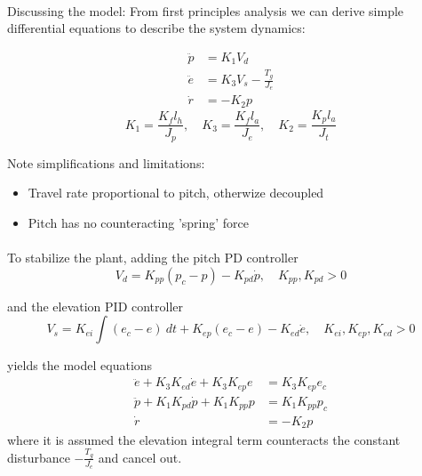 \paragraph{}
Discussing the model: From first principles analysis we can derive simple differential equations to describe the system dynamics:

\begin{subequations}
	\label{eq:dynamics}
	\begin{align}
		\ddot{p} &= K_1 V_d\\
		\ddot{e} &= K_3 V_s - \frac{T_g}{J_e}\\
		\dot{r} &= -K_2 p
	\end{align}
\end{subequations}
\begin{equation*}
K_1 = \frac{K_f l_h}{J_p}, \quad K_3 = \frac{K_f l_a}{J_e}, \quad K_2 = \frac{K_p l_a}{J_t}
\end{equation*}

Note simplifications and limitations:
\begin{itemize}
	\item{Travel rate proportional to pitch, otherwize decoupled}
	\item{Pitch has no counteracting 'spring' force}
\end{itemize}

\paragraph{}

To stabilize the plant, adding the pitch PD controller
\begin{equation*}
	V_d = K_{pp} (p_c - p) - K_{pd} \dot{p}, \quad K_{pp}, K_{pd} > 0
\end{equation*}

and the elevation PID controller
\begin{equation*}
	V_s = K_{ei} \int (e_c - e) \ dt +  K_{ep} (e_c - e) - K_{ed} \dot{e}, \quad K_{ei}, K_{ep}, K_{ed} > 0
\end{equation*}

yields the model equations
\begin{subequations}
\label{eq:model}
\begin{align}
	\ddot{e} + K_{3} K_{ed} \dot{e} + K_{3} K_{ep} e &= K_{3} K_{ep} e_{c} \label{eq:model_se_al_elev} \\
	\ddot{p} + K_{1} K_{pd} \dot{p} + K_{1} K_{pp} p &= K_{1} K_{pp} p_{c} \label{eq:model_se_al_pitch} \\
	\dot{r} &= -K_{2} p \label{eq:model_se_al_r} 
\end{align}
\end{subequations}
where it is assumed the elevation integral term counteracts the constant disturbance $-\frac{T_g}{J_e}$ and cancel out.

